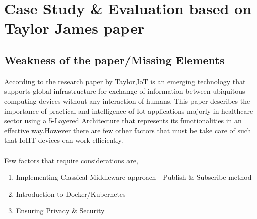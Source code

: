 \newpage
\section{Case Study \& Evaluation based on Taylor James paper}
\subsection{Weakness of the paper/Missing Elements}
According to the research paper by Taylor,IoT is an emerging technology that supports global infrastructure for exchange of information between ubiquitous computing devices without any interaction of humans. This paper describes the importance of practical and intelligence of Iot applications majorly in healthcare sector using a 5-Layered Architecture that represents its functionalities in an effective way.However there are few other factors that must be take care of such that IoHT devices can work efficiently\cite{5}.\\ \\
Few factors that require considerations are,
\begin{enumerate}
	\item Implementing Classical Middleware approach - Publish \& Subscribe method\\
	\item Introduction to Docker/Kubernetes\\
	\item Ensuring Privacy \& Security\\
\end{enumerate}
